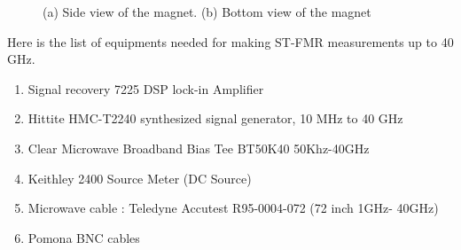\begin{figure}[!ht]
\centering
{}
\caption{(a) Side view of the magnet. (b) Bottom view of the magnet}
\end{figure}


Here is the list of equipments needed for making ST-FMR measurements up to 40 GHz.

\begin{enumerate}
  \item Signal recovery 7225 DSP lock-in Amplifier
  \item Hittite HMC-T2240 synthesized signal generator, 10 MHz to 40 GHz
  \item Clear Microwave Broadband Bias Tee BT50K40 50Khz-40GHz
  \item Keithley 2400 Source Meter (DC Source)
  \item Microwave cable : Teledyne Accutest R95-0004-072 (72 inch 1GHz- 40GHz)
  \item Pomona BNC cables

\end{enumerate}

